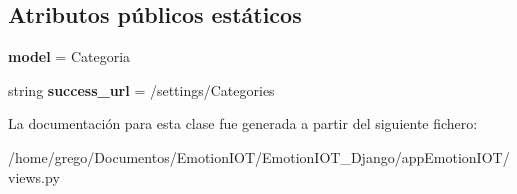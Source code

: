 \subsection*{Atributos públicos estáticos}
\begin{DoxyCompactItemize}
\item 
{\bfseries model} = Categoria\hypertarget{classappEmotionIOT_1_1views_1_1Categoria__delete_a88d0124de2c2a6cbe76c85077e305189}{}\label{classappEmotionIOT_1_1views_1_1Categoria__delete_a88d0124de2c2a6cbe76c85077e305189}

\item 
string {\bfseries success\+\_\+url} = \textquotesingle{}/settings/Categories\textquotesingle{}\hypertarget{classappEmotionIOT_1_1views_1_1Categoria__delete_aeaf38c2a3f14e1cd8b8be37ee9d82c9b}{}\label{classappEmotionIOT_1_1views_1_1Categoria__delete_aeaf38c2a3f14e1cd8b8be37ee9d82c9b}

\end{DoxyCompactItemize}


La documentación para esta clase fue generada a partir del siguiente fichero\+:\begin{DoxyCompactItemize}
\item 
/home/grego/\+Documentos/\+Emotion\+I\+O\+T/\+Emotion\+I\+O\+T\+\_\+\+Django/app\+Emotion\+I\+O\+T/views.\+py\end{DoxyCompactItemize}
